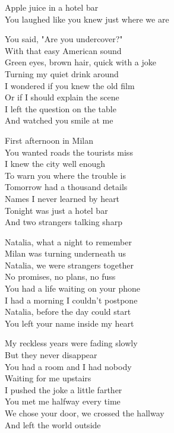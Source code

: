 \begin{lyrics}
Apple juice in a hotel bar\\
You laughed like you knew just where we are

You said, "Are you undercover?"\\
With that easy American sound\\
Green eyes, brown hair, quick with a joke\\
Turning my quiet drink around\\
I wondered if you knew the old film\\
Or if I should explain the scene\\
I left the question on the table\\
And watched you smile at me

First afternoon in Milan\\
You wanted roads the tourists miss\\
I knew the city well enough\\
To warn you where the trouble is\\
Tomorrow had a thousand details\\
Names I never learned by heart\\
Tonight was just a hotel bar\\
And two strangers talking sharp

Natalia, what a night to remember\\
Milan was turning underneath us\\
Natalia, we were strangers together\\
No promises, no plans, no fuss\\
You had a life waiting on your phone\\
I had a morning I couldn't postpone\\
Natalia, before the day could start\\
You left your name inside my heart

My reckless years were fading slowly\\
But they never disappear\\
You had a room and I had nobody\\
Waiting for me upstairs\\
I pushed the joke a little farther\\
You met me halfway every time\\
We chose your door, we crossed the hallway\\
And left the world outside


\end{lyrics}
